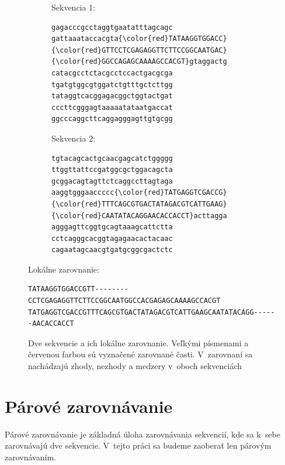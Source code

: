\begin{figure}[hbtp]
    \centering
    \begin{subfigure}[m]{0.45\textwidth}
    \centering
    \begin{center}
    Sekvencia 1:
    \end{center}
    \begin{BVerbatim}[commandchars=\\\{\}]
gagacccgcctaggtgaatatttagcagc
gattaaataccacgta{\color{red}TATAAGGTGGACC}
{\color{red}GTTCCTCGAGAGGTTCTTCCGGCAATGAC}
{\color{red}GGCCAGAGCAAAAGCCACGT}gtaggactg
catacgcctctacgcctccactgacgcga
tgatgtggcgtggatctgtttgctcttgg
tataggtcacggagacggctggtactgat
cccttcgggagtaaaaatataatgaccat
ggcccaggcttcaggagggagttgtgcgg

    \end{BVerbatim}
    \end{subfigure}
    \qquad
    \begin{subfigure}[m]{0.45\textwidth}
    \centering
    \begin{center}
    Sekvencia 2:
    \end{center}
    \begin{BVerbatim}[commandchars=\\\{\}]
tgtacagcactgcaacgagcatctggggg
ttggttattccgatggcgctggacagcta
gcggacagtagttctcaggccttagtaga
aaggtgggaaccccc{\color{red}TATGAGGTCGACCG}
{\color{red}TTTCAGCGTGACTATAGACGTCATTGAAG}
{\color{red}CAATATACAGGAACACCACCT}acttagga
agggagttcggtgcagtaaagcattctta
cctcagggcacggtagagaacactacaac
cagaatagcaacgtgatgcggcgactctc

    \end{BVerbatim}
    \end{subfigure}
    \begin{center}
    Lokálne zarovnanie:
    \end{center}
    \begin{BVerbatim}
TATAAGGTGGACCGTT--------CCTCGAGAGGTTCTTCCGGCAATGGCCACGAGAGCAAAAGCCACGT
TATGAGGTCGACCGTTTCAGCGTGACTATAGACGTCATTGAAGCAATATACAGG------AACACCACCT
    \end{BVerbatim}
    \caption[Lokálne zarovnanie]{Dve sekvencie a ich lokálne zarovnanie. Veľkými písmenami a červenou farbou sú vyznačené zarovnané časti. V~zarovnaní sa nachádzajú zhody, nezhody a medzery v~oboch sekvenciách}
    \label{fig:alignment_example}
\end{figure}

\section{Párové zarovnávanie}
Párové zarovnávanie je základná úloha zarovnávania sekvencií, kde sa k~sebe zarovnávajú dve sekvencie. V~tejto práci sa budeme zaoberať len párovým zarovnávaním.

